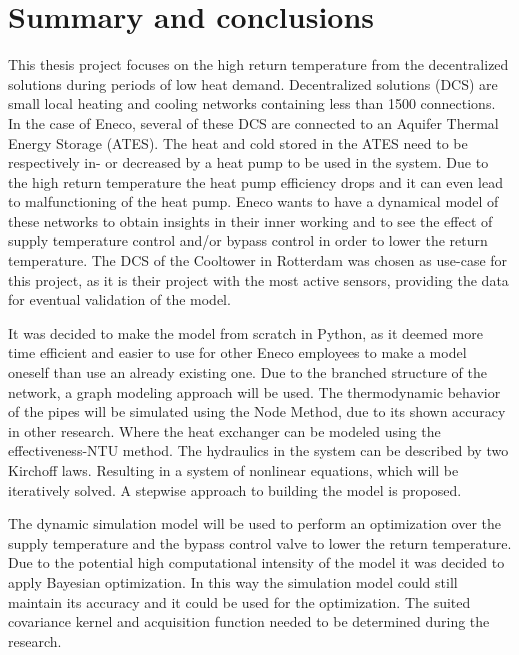 \chapter{Summary and conclusions}
This thesis project focuses on the high return temperature from the decentralized solutions
during periods of low heat demand. Decentralized solutions (DCS) are small local heating and cooling networks containing less than 1500 connections. In the case of Eneco, several of these DCS are connected to an Aquifer Thermal Energy Storage (ATES). The heat and cold stored in the ATES need to be respectively in- or decreased by a heat pump to be used in the system. Due to the high return temperature the heat pump efficiency drops and it can even lead to malfunctioning of the heat pump. Eneco wants to have a dynamical model of these networks to obtain insights in their inner working and to see the effect of supply temperature control and/or bypass control in order to lower the return temperature. The DCS of the Cooltower in Rotterdam was chosen as use-case for this project, as it is their project with the most active sensors, providing the data for eventual validation of the model. 

It was decided to make the model from scratch in Python, as it deemed more time efficient and easier to use for other Eneco employees to make a model oneself than use an already existing one. Due to the branched structure of the network, a graph modeling approach will be used. The thermodynamic behavior of the pipes will be simulated using the Node Method, due to its shown accuracy in other research. Where the heat exchanger can be modeled using the effectiveness-NTU method. The hydraulics in the system can be described by two Kirchoff laws. Resulting in a system of nonlinear equations, which will be iteratively solved. A stepwise approach to building the model is proposed.

The dynamic simulation model will be used to perform an optimization over the supply temperature and the bypass control valve to lower the return temperature. Due to the potential high computational intensity of the model it was decided to apply Bayesian optimization. In this way the simulation model could still maintain its accuracy and it could be used for the optimization. The suited covariance kernel and acquisition function needed to be determined during the research. 

